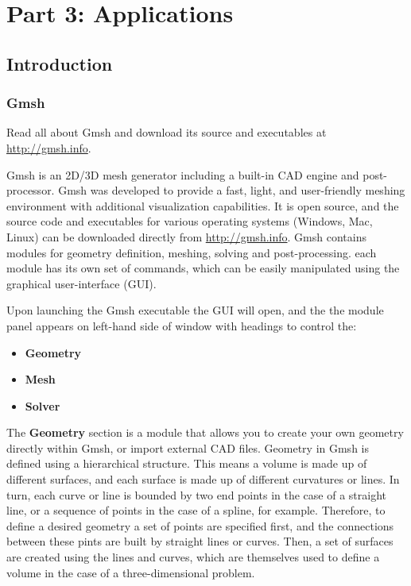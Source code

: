 \part{Part 3: Applications}

\graphicspath{ {./Pictures/} }

\chapter{Introduction}
\label{ch:intro for tutorials}
\section{Gmsh}
\begin{gmshnote}
	Read all about Gmsh and download its source and executables at \href{http://gmsh.info}{http://gmsh.info}.
\end{gmshnote}
Gmsh is an 2D/3D mesh generator including a built-in CAD engine and post-processor. Gmsh was developed to provide a fast, light, and user-friendly meshing environment with additional visualization capabilities. It is open source, and the source code and executables for various operating systems (Windows, Mac, Linux) can be downloaded directly from \href{http://gmsh.info}{http://gmsh.info}. Gmsh contains modules for geometry definition, meshing, solving and post-processing. each module has its own set of commands, which can be easily manipulated using the graphical user-interface (GUI).

Upon launching the Gmsh executable the GUI will open, and the the module panel appears on left-hand side of window with headings to control the:
\begin{itemize}
    \item \textbf{Geometry}
    \item \textbf{Mesh}
    \item \textbf{Solver}
\end{itemize}
The \textbf{Geometry} section is a module that allows you to create your own geometry directly within Gmsh, or import external CAD files. Geometry in Gmsh is defined using a hierarchical structure. This means a volume is made up of different surfaces, and each surface is made up of different curvatures or lines. In turn, each curve or line is bounded by two end points in the case of a straight line, or a sequence of points in the case of a spline, for example. Therefore, to define a desired geometry a set of points are specified first, and the connections between these pints are built by straight lines or curves. Then, a set of surfaces are created using the lines and curves, which are themselves used to define a volume in the case of a three-dimensional problem.

